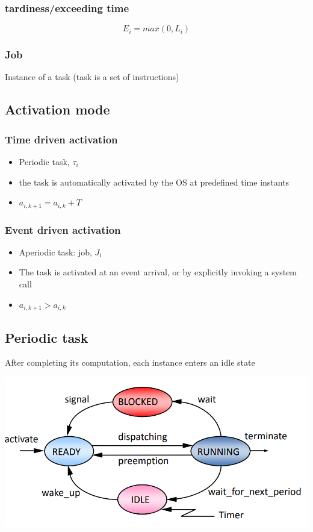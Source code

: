 \documentclass{book}
\begin{document}
\subsubsection{tardiness/exceeding time}
\[
    E_i=max(0,L_i)
\]

\subsubsection{Job}
Instance of a task (task is a set of instructions)

\subsection{Activation mode}
\subsubsection{Time driven activation}
\begin{itemize}
    \item Periodic task, $\tau_i$
    \item the task is automatically activated by the OS at predefined time instants
    \item $a_{i,k+1}=a_{i,k}+T$
\end{itemize}
\subsubsection{Event driven activation}
\begin{itemize}
    \item Aperiodic task: job, $J_i$
    \item The task is activated at an event arrival, or by explicitly invoking a system call
    \item $a_{i,k+1}>a_{i,k}$
\end{itemize}

\subsection{Periodic task}
After completing its computation, each instance enters an idle state

\includegraphics[width=0.9\linewidth]{images/periodictask.png}
\end{document}
